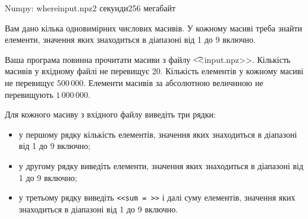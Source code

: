 \begin{problem}{Numpy: where}{input.npz}{}{2 секунди}{256 мегабайт}

Вам дано кілька одновимірних числових масивів. 
У кожному масиві треба знайти елементи, значення яких знаходиться в діапазоні від 1 до 9 включно.

\InputFile
Ваша програма повинна прочитати масиви з файлу {\t {<<input.npz>>}}.
Кількість масивів у вхідному файлі не перевищує 20.
Кількість елементів у кожному масиві не перевищує $500\,000$.
Елементи масивів за абсолютною величиною не перевищують $1\,000\,000$.

\OutputFile
Для кожного масиву з вхідного файлу виведіть три рядки:
\begin{itemize} 
\item у першому рядку кількість елементів, значення яких знаходиться в діапазоні від 1 до 9 включно;
\item у другому рядку виведіть елементи, значення яких знаходиться в діапазоні від 1 до 9 включно;
\item у третьому рядку виведіть \texttt{<<sum = >>} і далі суму елементів, значення яких знаходиться в діапазоні від 1 до 9 включно.
\end{itemize}


\Example
\begin{example}
%
\end{example}

\end{problem}

